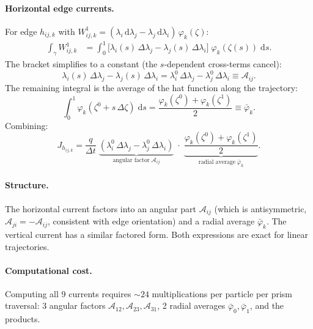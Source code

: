 \documentclass[11pt,a4paper]{article}
\newcommand{\dd}{\mathrm{d}}
\begin{document}
\paragraph{Horizontal edge currents.}
For edge $h_{ij,k}$ with
$W^1_{ij,k} = (\lambda_i\,\dd\lambda_j - \lambda_j\,\dd\lambda_i)\,
\varphi_k(\zeta)$:
\begin{align}
  \int_\gamma W^1_{ij,k}
    &= \int_0^1 \bigl[\lambda_i(s)\,\Delta\lambda_j
      - \lambda_j(s)\,\Delta\lambda_i\bigr]\;\varphi_k(\zeta(s))\;\dd s.
\end{align}
The bracket simplifies to a constant (the $s$-dependent cross-terms cancel):
\begin{equation}
  \lambda_i(s)\,\Delta\lambda_j - \lambda_j(s)\,\Delta\lambda_i
  = \lambda_i^0\,\Delta\lambda_j - \lambda_j^0\,\Delta\lambda_i
  \equiv \mathcal{A}_{ij}.
  \label{eq:angular_factor}
\end{equation}
The remaining integral is the average of the hat function along the trajectory:
\begin{equation}
  \int_0^1 \varphi_k(\zeta^0 + s\,\Delta\zeta)\;\dd s
    = \frac{\varphi_k(\zeta^0) + \varphi_k(\zeta^1)}{2}
    \equiv \bar\varphi_k.
\end{equation}
Combining:
\begin{equation}
  \boxed{
    J_{h_{ij,k}} = \frac{q}{\Delta t}\;
      \underbrace{(\lambda_i^0\,\Delta\lambda_j
        - \lambda_j^0\,\Delta\lambda_i)}_{\text{angular factor}
        \;\mathcal{A}_{ij}}
      \;\cdot\;
      \underbrace{\frac{\varphi_k(\zeta^0) + \varphi_k(\zeta^1)}{2}%
        }_{\text{radial average}\;\bar\varphi_k}.
  }
  \label{eq:J_horiz}
\end{equation}

\paragraph{Structure.}
The horizontal current factors into an angular part $\mathcal{A}_{ij}$ (which
is antisymmetric, $\mathcal{A}_{ji} = -\mathcal{A}_{ij}$, consistent with
edge orientation) and a radial average $\bar\varphi_k$. The vertical current
has a similar factored form. Both expressions are exact for linear
trajectories.

\paragraph{Computational cost.}
Computing all 9 currents requires $\sim 24$ multiplications per particle per
prism traversal: 3 angular factors $\mathcal{A}_{12}, \mathcal{A}_{23},
\mathcal{A}_{31}$, 2 radial averages $\bar\varphi_0, \bar\varphi_1$, and the
products.
\end{document}
